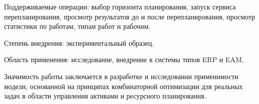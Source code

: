 Поддерживаемые операции: выбор горизонта планирования, запуск сервиса перепланирования, просмотр результатов до и после перепланирования, просмотр статистики по работам, типам работ и рабочим.

Степень внедрения: экспериментальный образец.

Область применения: исследование, внедрение в системы типов ERP и EAM.

Значимость работы заключается в разработке и исследовании применимости модели, основанной на принципах комбинаторной оптимизации для реальных задач в области управления активами и ресурсного планирования.

\clearpage
